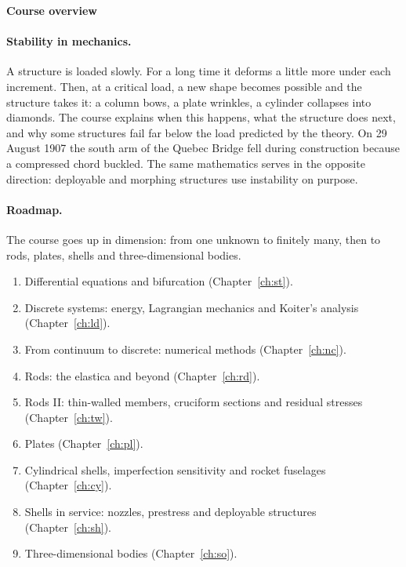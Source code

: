 \cleardoublepage
{}
{}
\thispagestyle{plain}

\noindent{\color{gray!70!black}\rule{\textwidth}{0.6pt}}\par\vspace{6pt}\noindent
{\sffamily\bfseries\Huge Course overview\par}
\vspace{18pt}

\paragraph{Stability in mechanics.}
A structure is loaded slowly. For a long time it deforms a little more
under each increment. Then, at a critical load, a new shape becomes
possible and the structure takes it: a column bows, a plate wrinkles, a
cylinder collapses into diamonds. The course explains when this happens,
what the structure does next, and why some structures fail far below the
load predicted by the theory. On 29 August 1907 the south arm of the Quebec Bridge
fell during construction because a compressed chord buckled. The same mathematics serves in the opposite
direction: deployable and morphing structures use instability on purpose.

\paragraph{Roadmap.}
The course goes up in dimension: from one unknown to finitely many, then
to rods, plates, shells and three-dimensional bodies.
\begin{enumerate}[itemsep=1pt]
  \item Differential equations and bifurcation (Chapter~\ref{ch:st}).
  \item Discrete systems: energy, Lagrangian mechanics and Koiter's analysis (Chapter~\ref{ch:ld}).
  \item From continuum to discrete: numerical methods (Chapter~\ref{ch:nc}).
  \item Rods: the elastica and beyond (Chapter~\ref{ch:rd}).
  \item Rods II: thin-walled members, cruciform sections and residual stresses (Chapter~\ref{ch:tw}).
  \item Plates (Chapter~\ref{ch:pl}).
  \item Cylindrical shells, imperfection sensitivity and rocket fuselages (Chapter~\ref{ch:cy}).
  \item Shells in service: nozzles, prestress and deployable structures (Chapter~\ref{ch:sh}).
  \item Three-dimensional bodies (Chapter~\ref{ch:so}).
\end{enumerate}

